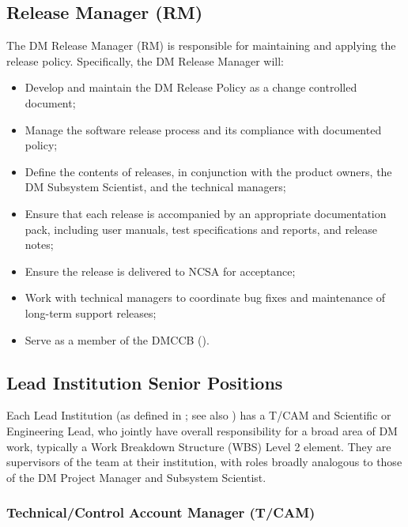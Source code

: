 \subsection{Release Manager (RM)}\label{role:dmrm}

The DM Release Manager (RM) is responsible for maintaining and applying the release policy.
Specifically, the DM Release Manager will:

\begin{itemize}

  \item{Develop and maintain the DM Release Policy as a change controlled
  document;}
  \item{Manage the software release process and its compliance with documented
  policy;}
  \item{Define the contents of releases, in conjunction with the product
  owners, the DM Subsystem Scientist, and the technical managers;}
  \item{Ensure that each release is accompanied by an appropriate
  documentation pack, including user manuals, test specifications and reports,
  and release notes;}
  \item{Ensure the release is delivered to NCSA for acceptance;}
  \item{Work with technical managers to coordinate bug fixes and maintenance
  of long-term support releases;}
  \item{Serve as a member of the DMCCB ().}

\end{itemize}

\subsection{Lead Institution Senior Positions}

Each Lead Institution (as defined in ; see also ) has a T/CAM and Scientific or Engineering Lead, who jointly have overall responsibility for a broad area of DM work, typically a Work Breakdown Structure (WBS) Level 2 element. They are supervisors of the team at their institution, with roles broadly analogous to those of the DM Project Manager and Subsystem Scientist.

\subsubsection{Technical/Control Account Manager (T/CAM) \label{role:tcam}}

